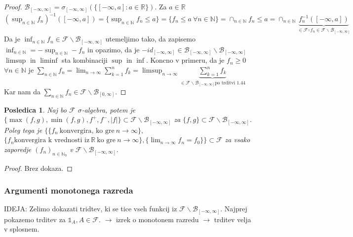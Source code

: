 \documentclass[a4paper,12pt]{article}
\theoremstyle{definition} %
\theoremstyle{plain} %
\newtheorem{posledica}[definicija]{Posledica}
\newcommand{\R}{\mathbb{R}}
\newcommand{\N}{\mathbb{N}}
\newcommand{\F}{\mathcal{F}}
\begin{document}
            \begin{proof}
                $\mathcal{B}_{[-\infty, \infty]} = \sigma_{[-\infty, \infty]}(\{[-\infty, a]: a\in\R\})$. Za $a \in \R$ 
                $\left(\sup_{n \in \N}f_n\right)^{-1}\left([-\infty, a]\right) = \{\sup_{n \in \N}f_n \leq a\} = \{f_n \leq a \ \forall n \in \N\} =
                 \cap_{n \in \N}{f_n \leq a}= \cap_{n \in \N}\underbrace{f_n^{-1}([-\infty, a])}_{\in \F \because f_n \in \F\backslash\mathcal{B}_{[-\infty, \infty]}}$
                 Da je $\inf_{n \in \N}f_n \in \F\backslash\mathcal{B}_{[-\infty, \infty]}$ utemeljimo tako, da zapisemo $\inf_{n \in \N} = -\sup_{n \in \N} - f_n$ in opazimo, da je $-id_{[-\infty, \infty]} \in \mathcal{B}_{[-\infty, \infty]}\backslash\mathcal{B}_{[-\infty, \infty]}$
                 $\limsup$ in $\liminf$ sta kombinaciji $\sup$ in $\inf$. Koncno v primeru, da je $f_n \geq 0$ $\forall n \in \N$ je $\sum_{n\in\N}f_n = \lim_{n \rightarrow \infty}\sum_{k = 1}^{n}f_k = \limsup_{n \rightarrow \infty}\underbrace{\sum_{k = 1}^nf_k}_{\in \F\backslash\mathcal{B}_{[-\infty, \infty]} \text{po trditvi 1.44}}$
                 Kar nam da $\sum_{n \in \N}f_n \in \F\backslash\mathcal{B}_{[0, \infty]}$.
            \end{proof}

            \begin{posledica}
                Naj bo $\F$ $\sigma$-algebra, potem je $\{\max(f, g), \min(f, g), f^+, f^-, |f|\} \subset \F\backslash\mathcal{B}_{[-\infty, \infty]}$ za $\{f, g\} \subset \F\backslash\mathcal{B}_{[-\infty, \infty]}.$ Poleg tega je 
                $\{\{f_n \ \text{konvergira, ko gre} \ n \rightarrow \infty\},$ 
                $ \{f_n \text{konvergira k vrednosti iz} \ \R \ \text{ko gre} \ n \rightarrow \infty\}, \{\lim_{n \rightarrow \infty}f_n = f_0\}\} \subset \F$ za vsako
                zaporedje $(f_n)_{n \in \N_0}$ v $\F\backslash\mathcal{B}_{[-\infty, \infty]}.$
            \end{posledica}

            \begin{proof}
                Brez dokaza.
            \end{proof}

        \subsubsection{Argumenti monotonega razreda}
            IDEJA: Zelimo dokazati tridtev, ki se tice vseh funkcij iz $\F\backslash\mathcal{B}_{[-\infty, \infty]}.$ Najprej pokazemo trditev za 
            $\mathds{1}_A, A \in \F$. $\rightarrow$ izrek o monotonem razredu $\rightarrow$ trditev velja v splosnem.
\end{document}
